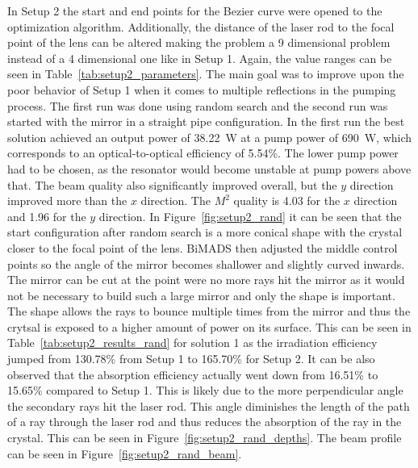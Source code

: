 \documentclass[a4paper,10pt]{article}
\newcommand{\figref}[1]{Figure~\ref{#1}}
\newcommand{\tabref}[1]{Table~\ref{#1}}
\begin{document}
    In Setup 2 the start and end points for the Bezier curve were opened
    to the optimization algorithm.
    Additionally, the distance of the laser rod to the focal point of the
    lens can be altered making the problem a 9 dimensional problem instead
    of a 4 dimensional one like in Setup 1.
    Again, the value ranges can be seen in \tabref{tab:setup2_parameters}.
    The main goal was to improve upon the poor behavior of Setup 1 when
    it comes to multiple reflections in the pumping process.
    The first run was done using random search and the second run was
    started with the mirror in a straight pipe configuration.
    In the first run the best solution achieved an output power
    of \SI{38.22}{W} at a pump power of \SI{690}{W}, which corresponds
    to an optical-to-optical efficiency of 5.54\%.
    The lower pump power had to be chosen, as the resonator would become
    unstable at pump powers above that.
    The beam quality also significantly improved overall, but the $y$
    direction improved more than the $x$ direction.
    The $M^2$ quality is 4.03 for the $x$ direction and 1.96 for the
    $y$ direction.
    In \figref{fig:setup2_rand} it can be seen that the start configuration
    after random search is a more conical shape with the crystal closer
    to the focal point of the lens.
    BiMADS then adjusted the middle control points so the angle of the
    mirror becomes shallower and slightly curved inwards.
    The mirror can be cut at the point were no more rays hit the mirror
    as it would not be necessary to build such a large mirror and only
    the shape is important.
    The shape allows the rays to bounce multiple times from the mirror
    and thus the crytsal is exposed to a higher amount of power on its
    surface.
    This can be seen in \tabref{tab:setup2_results_rand} for solution 1
    as the irradiation efficiency jumped from 130.78\% from Setup 1
    to 165.70\% for Setup 2.
    It can be also observed that the absorption efficiency actually
    went down from 16.51\% to 15.65\% compared to Setup 1.
    This is likely due to the more perpendicular angle the secondary
    rays hit the laser rod.
    This angle diminishes the length of the path of a ray through the
    laser rod and thus reduces the absorption of the ray in the crystal.
    This can be seen in \figref{fig:setup2_rand_depths}.
    The beam profile can be seen in \figref{fig:setup2_rand_beam}.
\end{document}
